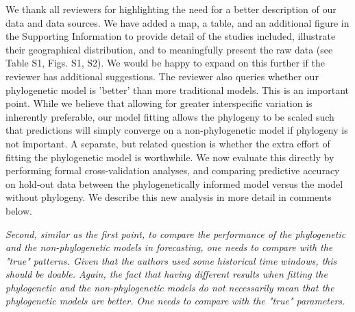 \documentclass[11pt]{article}
\begin{document}
We thank all reviewers for highlighting the need for a better description of our data and data sources. We have added a map, a table, and an additional figure in the Supporting Information to provide detail of the studies included, illustrate their geographical distribution, and to meaningfully present the raw data (see Table S1, Figs. S1, S2). We would be happy to expand on this further if the reviewer has additional suggestions. The reviewer also queries whether our phylogenetic model is 'better' than more traditional models. This is an important point. While we believe that allowing for greater interspecific variation is inherently preferable, our model fitting allows the phylogeny to be scaled such that predictions will simply converge on a non-phylogenetic model if phylogeny is not important. A separate, but related question is whether the extra effort of fitting the phylogenetic model is worthwhile. We now evaluate this directly by performing formal cross-validation analyses, and comparing predictive accuracy on hold-out data between the phylogenetically informed model versus the model without phylogeny. We describe this new analysis in more detail in comments below.  

\emph{Second, similar as the first point, to compare the performance of the phylogenetic and the non-phylogenetic models in forecasting, one needs to compare with the "true" patterns. Given that the authors used some historical time windows, this should be doable. Again, the fact that having different results when fitting the phylogenetic and the non-phylogenetic models do not necessarily mean that the phylogenetic models are better. One needs to compare with the "true" parameters.}\\
\end{document}
